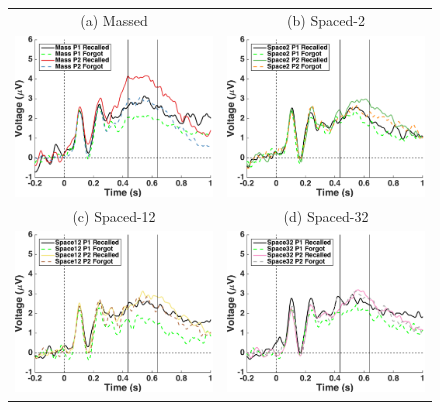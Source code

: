 

\begin{figure}[hp]
  \centering
  \begin{tabular}{cc}
  \multicolumn{1}{c}{(a) Massed} & \multicolumn{1}{c}{(b) Spaced-2} \\
  \includegraphics[width=.35\textwidth]{./figs/exp2/tla_single_ga_word_rc_mass_p1_word_fo_mass_p1_word_rc_mass_p2_word_fo_mass_p2_E62_E72_E76_E77_E78_E84_E85_-200_1000_legend_xylabel} &
  \includegraphics[width=.35\textwidth]{./figs/exp2/tla_single_ga_word_rc_spac2_p1_word_fo_spac2_p1_word_rc_spac2_p2_word_fo_spac2_p2_E62_E72_E76_E77_E78_E84_E85_-200_1000_legend_xylabel} \\
  \multicolumn{1}{c}{(c) Spaced-12} & \multicolumn{1}{c}{(d) Spaced-32} \\
  \includegraphics[width=.35\textwidth]{./figs/exp2/tla_single_ga_word_rc_spac12_p1_word_fo_spac12_p1_word_rc_spac12_p2_word_fo_spac12_p2_E62_E72_E76_E77_E78_E84_E85_-200_1000_legend_xylabel} &
  \includegraphics[width=.35\textwidth]{./figs/exp2/tla_single_ga_word_rc_spac32_p1_word_fo_spac32_p1_word_rc_spac32_p2_word_fo_spac32_p2_E62_E72_E76_E77_E78_E84_E85_-200_1000_legend_xylabel} \\

\end{tabular}
\end{figure}
